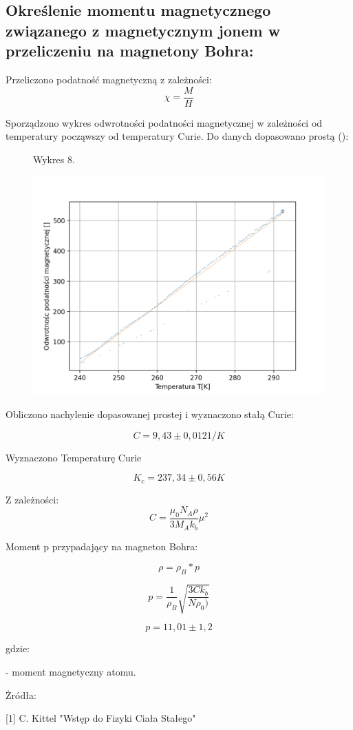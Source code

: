 \documentclass[a4paper]{article}
\begin{document}
\subsection{Określenie momentu magnetycznego związanego z magnetycznym jonem w przeliczeniu na magnetony Bohra:}

Przeliczono podatność magnetyczną z zależności:
\begin{equation}
    \chi = \frac{M}{H}
\end{equation}


\newpage
Sporządzono wykres odwrotności podatności magnetycznej w zależności od temperatury począwszy od temperatury Curie. Do danych dopasowano prostą ():

\begin{figure}[H]
    \centering
    Wykres 8. 
    
    \includegraphics[width = 12cm]{podatnosc.png}
    \label{fig:my_label}
\end{figure}

Obliczono nachylenie dopasowanej prostej i wyznaczono stałą Curie:

$$C = 9,43 \pm 0,012 1/K$$

Wyznaczono Temperaturę Curie

$$ K_c=237,34 \pm  0,56 K$$

Z zależności:
\begin{equation}
C = \frac{\mu_0 N_A \rho}{3 M_A k_b}\mu^2
\end{equation}

Moment p przypadający na magneton Bohra:

\begin{equation}
    \rho = \rho_B *p 
\end{equation}

\begin{equation}
    p = \frac{1}{\rho_B}\sqrt{\frac{3C k_b}{N\rho_0)}}
\end{equation}

$$p = 11,01 \pm 1,2$$

gdzie:

\mu - moment magnetyczny atomu.



Żródła:

[1] C. Kittel "Wstęp do Fizyki Ciała Stałego"
\end{document}
